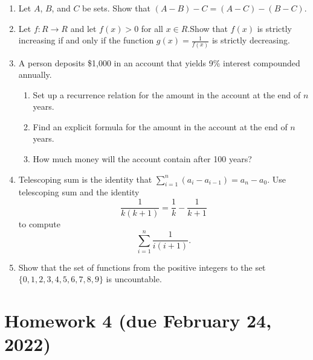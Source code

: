 \documentclass[11pt]{article}
\begin{document}
\begin{enumerate}
    \item Let $A$, $B$, and $C$ be sets. Show that $(A-B)-C = (A-C)-(B-C)$.
    \item Let $f : R \to R$ and let $f(x) > 0$ for all $x \in R$.Show that $f(x)$ is strictly increasing if and only if the function $g(x) = \frac{1}{f(x)}$ is strictly decreasing.
    \item A person deposits \$1,000 in an account that yields 9\% interest compounded annually.
    \begin{enumerate}
        \item Set up a recurrence relation for the amount in the account at the end of $n$ years.
        \item Find an explicit formula for the amount in the account at the end of $n$ years.
        \item How much money will the account contain after 100 years?
    \end{enumerate}
    \item Telescoping sum is the identity that $\sum^{n}_{i=1}(a_i - a_{i-1}) = a_n - a_0$. Use telescoping sum and the identity
    \[\frac{1}{k(k+1)} = \frac{1}{k} - \frac{1}{k+1}\]
    to compute
    \[\sum_{i=1}^{n} \frac{1}{i(i+1)}.\]
    \item Show that the set of functions from the positive integers to the set $\{ 0, 1, 2, 3, 4, 5, 6, 7, 8, 9 \}$ is uncountable.
\end{enumerate}

\section*{Homework 4 (due February 24, 2022)}
\end{document}
